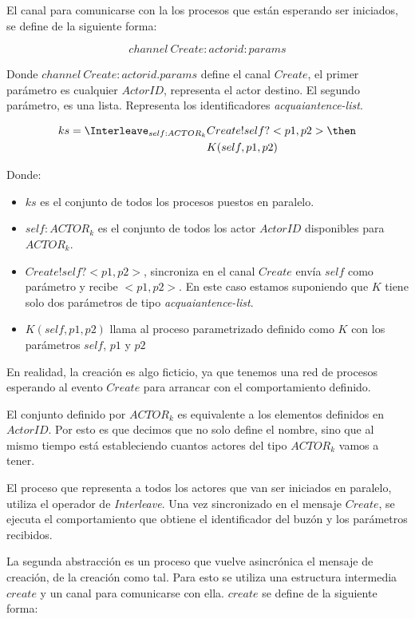 El canal para comunicarse con la los procesos que están esperando ser iniciados, se define de la siguiente forma:

\[
channel\ Create:actorid:params
\]

Donde $channel\ Create:actorid.params$ define el canal $Create$, el primer parámetro es cualquier $ActorID$, representa el actor destino. El segundo parámetro, es una lista. Representa los identificadores \textit{acquaiantence-list}. 

\begin{align*}
ks = \Interleave_{ self : ACTOR_k } & Create!self?<p1, p2> \then \\
& K(self, p1, p2) 
\end{align*}

Donde:

\begin{itemize}
 \item $ks$ es el conjunto de todos los procesos puestos en paralelo.
 \item $self : ACTOR_k$ es el conjunto de todos los actor $ActorID$ disponibles para $ACTOR_k$.
 \item $Create!self?<p1, p2>$, sincroniza en el canal $Create$ envía $self$ como parámetro y recibe $<p1, p2>$. En este caso estamos suponiendo que $K$ tiene solo dos parámetros de tipo \textit{acquaiantence-list}.
 \item $K(self, p1, p2)$ llama al proceso parametrizado definido como $K$ con los parámetros $self$, $p1$ y $p2$
\end{itemize}

En realidad, la creación es algo ficticio, ya que tenemos una red de procesos \CSP esperando al evento $Create$ para arrancar con el comportamiento definido. 

El conjunto definido por $ACTOR_k$ es equivalente a los elementos definidos en $ActorID$. Por esto es que decimos que no solo define el nombre, sino que al mismo tiempo está estableciendo cuantos actores del tipo $ACTOR_k$ vamos a tener.

El proceso que representa a todos los actores que van ser iniciados en paralelo, utiliza el operador de \textit{Interleave}. Una vez sincronizado en el mensaje $Create$, se ejecuta el comportamiento que obtiene el identificador del buzón y los parámetros recibidos. 

La segunda abstracción es un proceso que vuelve asincrónica el mensaje de creación, de la creación como tal. Para esto se utiliza una estructura intermedia $create$ y un canal para comunicarse con ella. $create$ se define de la siguiente forma: 

